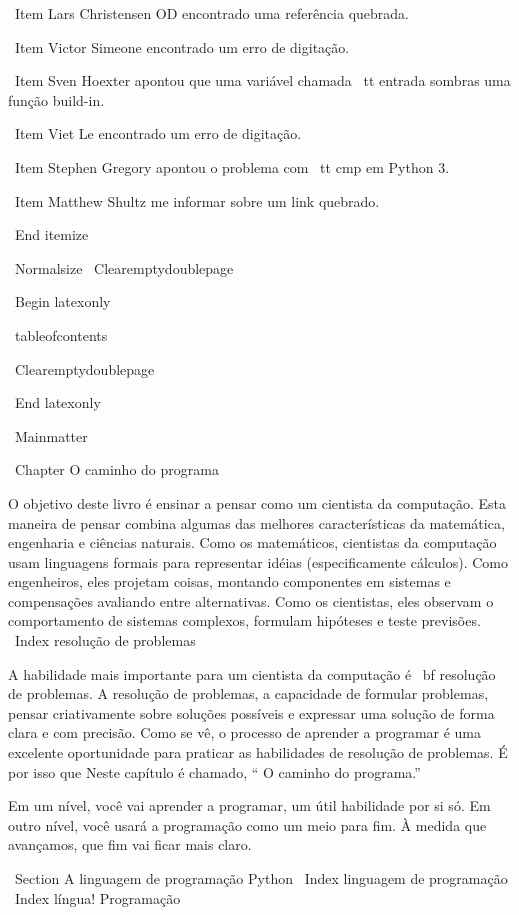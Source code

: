 \documentclass[10pt]{book}
\begin{document}
\ Item Lars Christensen OD encontrado uma referência quebrada.

\ Item Victor Simeone encontrado um erro de digitação.

\ Item Sven Hoexter apontou que uma variável chamada {\ tt entrada}
sombras uma função build-in.

\ Item Viet Le encontrado um erro de digitação.

\ Item Stephen Gregory apontou o problema com {\ tt cmp}
em Python 3.

\ Item Matthew Shultz me informar sobre um link quebrado.


\ End {itemize}

\ Normalsize
\ Clearemptydoublepage

\ Begin {latexonly}

\ tableofcontents

\ Clearemptydoublepage

\ End {latexonly}

\ Mainmatter

\ Chapter {O caminho do programa}

O objetivo deste livro é ensinar a pensar como um
cientista da computação. Esta maneira de pensar combina algumas das melhores características
da matemática, engenharia e ciências naturais. Como os matemáticos,
cientistas da computação usam linguagens formais para representar idéias (especificamente
cálculos). Como engenheiros, eles projetam coisas, montando componentes
em sistemas e compensações avaliando entre alternativas. Como os cientistas,
eles observam o comportamento de sistemas complexos, formulam hipóteses e teste
previsões.
\ Index {} resolução de problemas

A habilidade mais importante para um cientista da computação é {\ bf
resolução de problemas}. A resolução de problemas, a capacidade de formular
problemas, pensar criativamente sobre soluções possíveis e expressar uma solução de forma clara
e com precisão. Como se vê, o processo de aprender a programar é uma
excelente oportunidade para praticar as habilidades de resolução de problemas. É por isso que
Neste capítulo é chamado, `` O caminho do programa.''

Em um nível, você vai aprender a programar, um útil
habilidade por si só. Em outro nível, você usará a programação como um meio para
fim. À medida que avançamos, que fim vai ficar mais claro.

\ Section {A linguagem de programação Python}
\ Index {linguagem de programação}
\ Index {língua! Programação}
\end{document}
